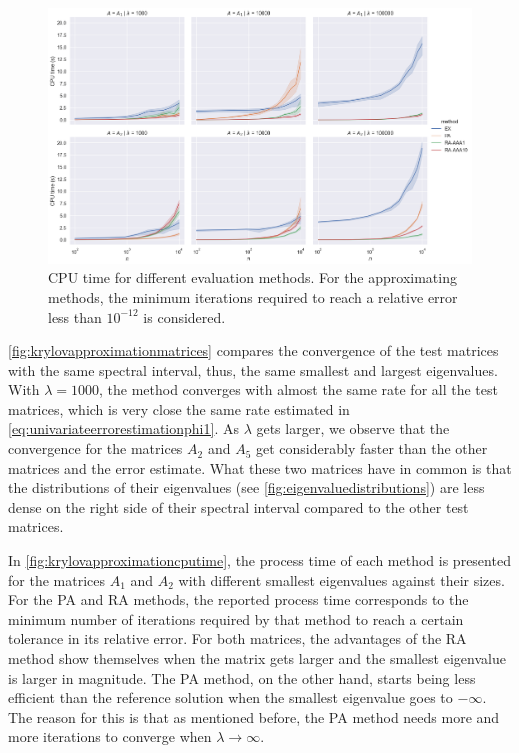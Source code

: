 \begin{figure}[h]
    \centering
    \includegraphics[width=.9\textwidth]{img/krylovapproximation/cputime_methods.png}
    \caption{
        CPU time for different evaluation methods. For the approximating methods,
        the minimum iterations required to reach a relative error less than $10^{-12}$
        is considered.
    }
    \label{fig:krylovapproximationcputime}
\end{figure}

\autoref{fig:krylovapproximationmatrices} compares the convergence of the
test matrices with the same spectral interval, thus, the same smallest and largest
eigenvalues.
With $\lambda = 1000$, the method converges with almost the same rate for all
the test matrices, which is very close the same rate estimated in
\eqref{eq:univariateerrorestimationphi1}.
As $\lambda$ gets larger, we observe that the convergence for the matrices
$A_2$ and $A_5$ get considerably faster than the other matrices and the error estimate.
What these two matrices have in common is that the distributions of their eigenvalues
(see \autoref{fig:eigenvaluedistributions}) are less dense on the right side of their
spectral interval compared to the other test matrices.

In \autoref{fig:krylovapproximationcputime}, the process time of each method is presented for
the matrices $A_1$ and $A_2$ with different smallest eigenvalues against their sizes. For
the PA and RA methods, the reported process time corresponds to the minimum number of
iterations required by that method to reach a certain tolerance in its relative error.
For both matrices, the advantages of the RA method show themselves when the matrix gets
larger and the smallest eigenvalue is larger in magnitude. The PA method, on the other hand,
starts being less efficient than the reference solution when the smallest eigenvalue goes
to $-\infty$. The reason for this is that as mentioned before, the PA method needs more
and more iterations to converge when $\lambda \to \infty$.

